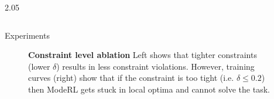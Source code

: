 \documentclass[final,11pt]{beamer}
\newlength{\colwidth}
\begin{document}
\begin{frame}[t]
\begin{columns}[t]
\begin{column}{2.05\colwidth}
\begin{columns}[t]
\begin{column}{\colwidth}
  \begin{block}{Experiments}
  \begin{figure}[H]
    \caption{\textbf{Constraint level ablation} Left shows that tighter constraints (lower $\delta$) results in less constraint violations. However, training curves (right) show that if the constraint is too tight (i.e. $\delta \leq 0.2$) then \alert{ModeRL} gets stuck in local optima and cannot solve the task.}
    \label{fig-training-curve}
  \end{figure}

\end{block}
\end{column}
\end{columns}
\end{column}
\end{columns}
\end{frame}
\end{document}
